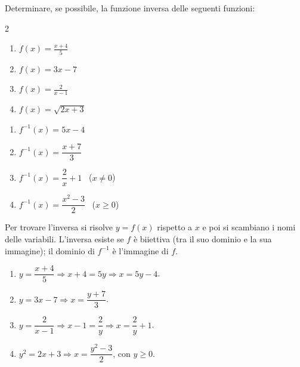 
\begin{question}[ID=4.2, subtitle={Funzione inversa — serie 2}, difficulty=media, tags={funzioni,inversa}]
Determinare, se possibile, la funzione inversa delle seguenti funzioni:

\begin{center}\begin{minipage}{0.92\linewidth}
\begin{multicols}{2}
\begin{enumerate}[leftmargin=3.2cm]
\item $f(x)=\frac{x+4}{5}$
\item $f(x)=3x-7$
\item $f(x)=\frac{2}{x-1}$
\item $f(x)=\sqrt{2x+3}$
\end{enumerate}
\end{multicols}
\end{minipage}\end{center}
\begin{solution}
\begin{enumerate}
    \item $f^{-1}(x)=5x-4$
    \item $f^{-1}(x)=\dfrac{x+7}{3}$
    \item $f^{-1}(x)=\dfrac2x+1$ \ ($x\neq0$)
    \item $f^{-1}(x)=\dfrac{x^2-3}{2}$ \ ($x\geq0$)
\end{enumerate}
\end{solution}
\begin{explanation}
Per trovare l'inversa si risolve $y=f(x)$ rispetto a $x$ e poi si scambiano i nomi delle variabili. L'inversa esiste se $f$ è biiettiva (tra il suo dominio e la sua immagine); il dominio di $f^{-1}$ è l'immagine di $f$.
\begin{enumerate}
    \item $y=\dfrac{x+4}{5} \Rightarrow x+4=5y \Rightarrow x=5y-4$.
    \item $y=3x-7 \Rightarrow x=\dfrac{y+7}{3}$.
    \item $y=\dfrac{2}{x-1} \Rightarrow x-1=\dfrac2y \Rightarrow x=\dfrac2y+1$.
    \item $y^2=2x+3 \Rightarrow x=\dfrac{y^2-3}{2}$, con $y\geq0$.
\end{enumerate}
\end{explanation}

\end{question}

